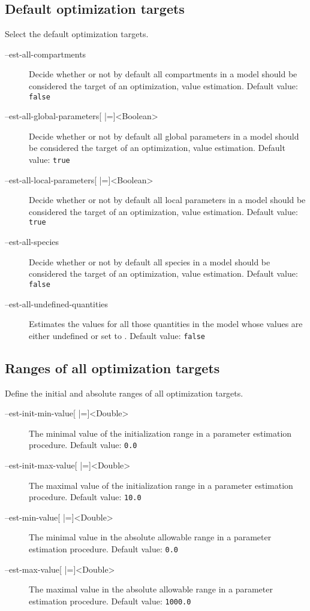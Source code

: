 \subsection{Default optimization targets}
Select the default optimization targets.
\begin{description}
\item[--est-all-compartments]
          Decide whether or not by default all compartments in a model
          should be considered the target of an optimization, \ie value
          estimation.
          Default value: \texttt{false}
\item[--est-all-global-parameters{[} |={]}<Boolean>]
          Decide whether or not by default all global parameters in a model
          should be considered the target of an optimization, \ie value
          estimation.
          Default value: \texttt{true}
\item[--est-all-local-parameters{[} |={]}<Boolean>]
          Decide whether or not by default all local parameters in a model
          should be considered the target of an optimization, \ie value
          estimation.
          Default value: \texttt{true}
\item[--est-all-species]
          Decide whether or not by default all species in a model should
          be considered the target of an optimization, \ie value estimation.
          Default value: \texttt{false}
\item[--est-all-undefined-quantities]
          Estimates the values for all those quantities in the model whose
          values are either undefined or set to \NaN.
          Default value: \texttt{false}
\end{description}

\subsection{Ranges of all optimization targets}
Define the initial and absolute ranges of all optimization targets.
\begin{description}
\item[--est-init-min-value{[} |={]}<Double>]
          The minimal value of the initialization range in a parameter estimation procedure.
          Default value: \texttt{0.0}
\item[--est-init-max-value{[} |={]}<Double>]
          The maximal value of the initialization range in a parameter
          estimation procedure.
          Default value: \texttt{10.0}
\item[--est-min-value{[} |={]}<Double>]
          The minimal value in the absolute allowable range in a parameter
          estimation procedure.
          Default value: \texttt{0.0}
\item[--est-max-value{[} |={]}<Double>]
          The maximal value in the absolute allowable range in a parameter
          estimation procedure.
          Default value: \texttt{1000.0}
\end{description}

